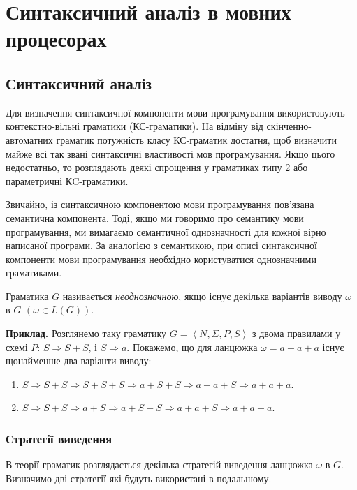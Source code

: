 \setcounter{section}{6}

\section{Синтаксичний аналіз в мовних процесорах}

\subsection{Синтаксичний аналіз}

Для визначення синтаксичної компоненти мови програмування використовують контекстно-вільні граматики (КС-граматики). На відміну від скінченно-автоматних граматик потужність класу КС-граматик достатня, щоб визначити майже всі так звані синтаксичні властивості мов програмування. Якщо цього недостатньо, то розглядають деякі спрощення у граматиках типу 2
або параметричні КC-граматики. \medskip

Звичайно, із синтаксичною компонентою мови програмування пов'язана семантична компонента. Тоді, якщо ми говоримо про семантику мови програмування, ми вимагаємо семантичної однозначності для кожної вірно написаної програми. За аналогією з семантикою, при описі синтаксичної компоненти мови програмування необхідно користуватися однозначними граматиками. \medskip

Граматика $G$ називається \textit{неоднозначною}, якщо існує декілька варіантів виводу $\omega$ в $G$ $\left(\omega \in L(G)\right)$. \medskip

\textbf{Приклад.} Розглянемо таку граматику $G = \left\langle N, \Sigma, P, S\right\rangle$ з двома правилами у схемі $P$: $S \Rightarrow S + S$, і $S \Rightarrow a$. Покажемо, що для ланцюжка $\omega = a + a + a$ існує щонайменше два варіанти виводу:
\begin{enumerate}
	\item $S \Rightarrow S + S \Rightarrow S + S + S \Rightarrow a + S + S \Rightarrow a + a + S \Rightarrow a + a + a$.
	\item $S \Rightarrow S + S \Rightarrow a + S \Rightarrow a + S + S \Rightarrow a + a + S \Rightarrow a + a + a$.
\end{enumerate}

\subsubsection{Стратегії виведення}

В теорії граматик розглядається декілька стратегій виведення ланцюжка $\omega$ в $G$. Визначимо дві стратегії які будуть використані в подальшому. \medskip\

